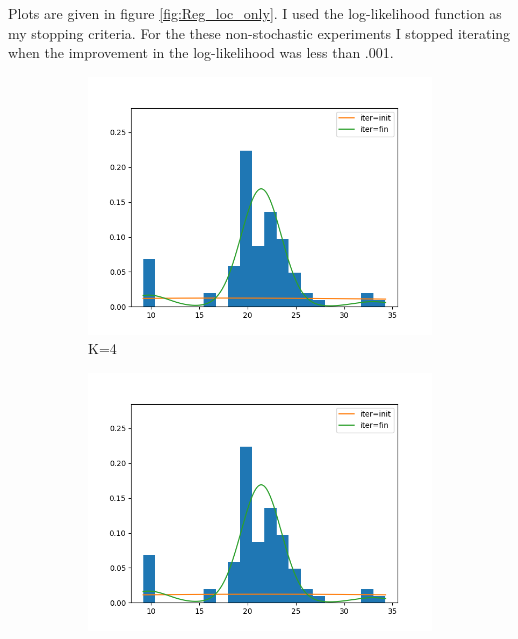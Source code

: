 Plots are given in figure \ref{fig:Reg_loc_only}. 
I used the log-likelihood function as my stopping criteria.
For the these non-stochastic experiments I stopped iterating when the improvement in the log-likelihood was less than .001.




\begin{figure}
     \centering
     \begin{subfigure}[b]{0.3\textwidth}
         \centering
         \includegraphics[width=\textwidth]{../code/regular_loc_only_plots/galaxies_hist_k_4.png}
         \caption{K=4}
         \label{fig:Reg_loc_only4}
     \end{subfigure}
     \hfill
     \begin{subfigure}[b]{0.3\textwidth}
         \centering
         \includegraphics[width=\textwidth]{../code/regular_loc_only_plots/galaxies_hist_k_6.png}

\end{subfigure}
\end{figure}

